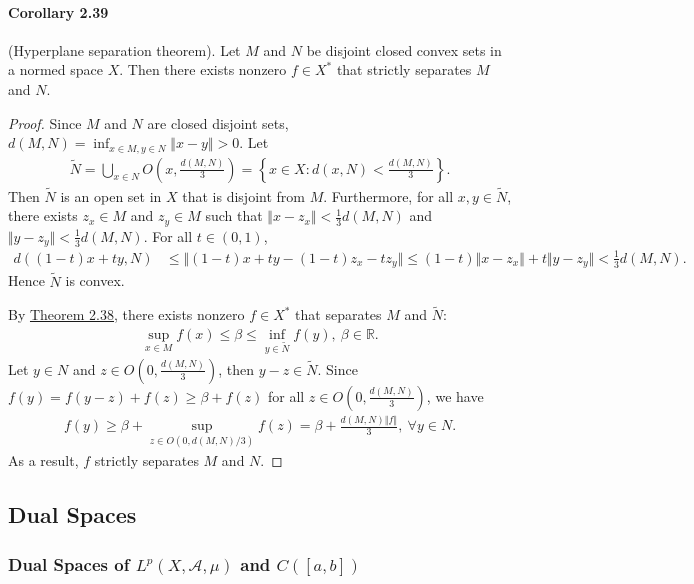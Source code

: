 \documentclass{article}
\begin{document}
\paragraph{Corollary 2.39\label{cor:2.39}} (Hyperplane separation theorem). Let $M$ and $N$ be disjoint closed convex sets in a normed space $X$. Then there exists nonzero $f\in X^*$ that strictly separates $M$ and $N$.
\begin{proof}
Since $M$ and $N$ are closed disjoint sets, $d(M,N)=\inf_{x\in M,y\in N}\Vert x-y\Vert > 0$. Let
\begin{align*}
	\widetilde{N} = \bigcup_{x\in N} O\left(x,\frac{d(M,N)}{3}\right)= \left\{x\in X:d(x,N)<\frac{d(M,N)}{3}\right\}.
\end{align*}
Then $\widetilde{N}$ is an open set in $X$ that is disjoint from $M$. Furthermore, for all $x,y\in\widetilde{N}$, there exists $z_x\in M$ and $z_y\in M$ such that $\Vert x-z_x\Vert< \frac{1}{3}d(M,N)$ and $\Vert y-z_y\Vert< \frac{1}{3}d(M,N)$. For all $t\in(0,1)$,
\begin{align*}
	d\left((1-t)x+ty, N\right) &\leq \Vert (1-t)x+ty - (1-t)z_x - tz_y\Vert\leq (1-t)\Vert x-z_x\Vert + t\Vert y-z_y\Vert < \frac{1}{3}d(M,N).
\end{align*}
Hence $\widetilde{N}$ is convex. 

By \hyperref[thm:2.38]{Theorem 2.38}, there exists nonzero $f\in X^*$ that separates $M$ and $\widetilde{N}$:
\begin{align*}
	\sup_{x\in M} f(x) \leq \beta\leq \inf_{y\in\widetilde{N}} f(y),\ \beta\in\mathbb{R}.
\end{align*}
Let $y\in N$ and $z\in O\left(0,\frac{d(M,N)}{3}\right)$, then $y-z\in\widetilde{N}$. Since $f(y)=f(y-z)+f(z)\geq \beta +f(z)$ for all $z\in O\left(0,\frac{d(M,N)}{3}\right)$, we have
\begin{align*}
	f(y) \geq \beta + \sup_{z\in O\left(0,d(M,N)/3\right)}f(z) = \beta + \frac{d(M,N)\Vert f\Vert}{3},\ \forall y\in N.
\end{align*}
As a result, $f$ strictly separates $M$ and $N$.
\end{proof}

\subsection{Dual Spaces}
\subsubsection{Dual Spaces of $L^p(X,\mathscr{A},\mu)$ and $C([a,b])$}
\end{document}
